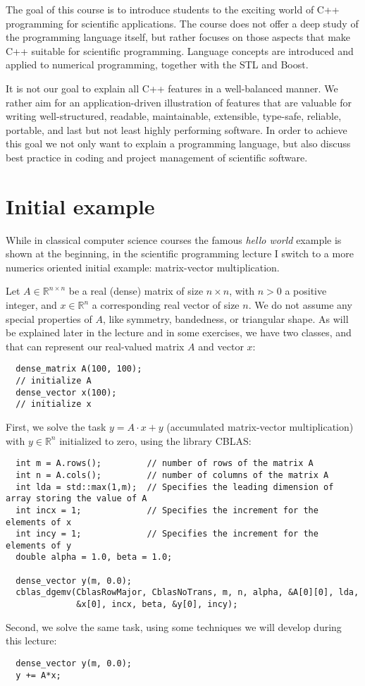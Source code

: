 The goal of this course is to introduce students to the exciting world of C++ programming for scientific applications. The course
does not offer a deep study of the programming language itself, but rather focuses on those aspects that make C++ suitable for
scientific programming. Language concepts are introduced and applied to numerical programming, together with the STL and Boost.

It is not our goal to explain all C++ features in a well-balanced manner. We rather aim for an application-driven illustration of
features that are valuable for writing well-structured, readable, maintainable, extensible, type-safe, reliable, portable, and last
but not least highly performing software. In order to achieve this goal we not only want to explain a programming language, but
also discuss best practice in coding and project management of scientific software.

\section{Initial example}
While in classical computer science courses the famous \emph{hello world} example is shown at the beginning, in the scientific
programming lecture I switch to a more numerics oriented initial example: matrix-vector multiplication.

Let $A\in\mathbb{R}^{n\times n}$ be a real (dense) matrix of size $n\times n$, with $n > 0$ a positive integer, and $x\in\mathbb{R}^n$
a corresponding real vector of size $n$. We do not assume any special properties of $A$, like symmetry, bandedness, or triangular
shape. As will be explained later in the lecture and in some exercises, we have two classes,  and 
that can represent our real-valued matrix $A$ and vector $x$:
%
\begin{verbatim}
  dense_matrix A(100, 100);
  // initialize A
  dense_vector x(100);
  // initialize x
\end{verbatim}

First, we solve the task $y = A\cdot x + y$ (accumulated matrix-vector multiplication) with $y\in\mathbb{R}^n$ initialized to zero,
using the library CBLAS:
%
\begin{verbatim}
  int m = A.rows();         // number of rows of the matrix A
  int n = A.cols();         // number of columns of the matrix A
  int lda = std::max(1,m);  // Specifies the leading dimension of array storing the value of A
  int incx = 1;             // Specifies the increment for the elements of x
  int incy = 1;             // Specifies the increment for the elements of y
  double alpha = 1.0, beta = 1.0;

  dense_vector y(m, 0.0);
  cblas_dgemv(CblasRowMajor, CblasNoTrans, m, n, alpha, &A[0][0], lda,
              &x[0], incx, beta, &y[0], incy);
\end{verbatim}
%
Second, we solve the same task, using some techniques we will develop during this lecture:
%
\begin{verbatim}
  dense_vector y(m, 0.0);
  y += A*x;
\end{verbatim}

